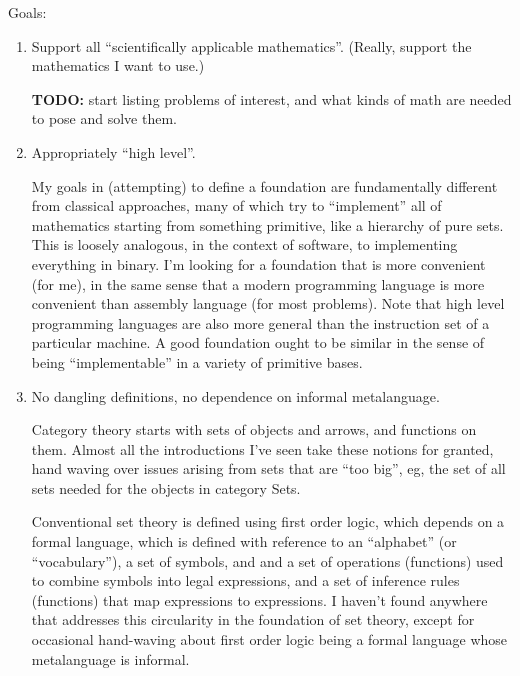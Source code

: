 \documentclass[11pt]{book}
\begin{document}
Goals:
\begin{enumerate}
  \item Support all ``scientifically applicable mathematics''.
  (Really, support the mathematics I want to use.) \par
  \textbf{TODO:} start listing problems of interest,
  and what kinds of math are needed to pose and solve them.
  
  \item Appropriately ``high level''. \par
  My goals in (attempting) to define a foundation are fundamentally
different from classical approaches,
many of which try to ``implement'' all of mathematics starting from
something primitive, like a hierarchy of pure sets.
This is loosely analogous, in the context of software,
to implementing everything in binary.
I'm looking for a foundation that is more convenient (for me),
in the same sense that a modern programming language is more
convenient than assembly language (for most problems).
Note that high level programming languages are also more general
than the instruction set of a particular machine.
A good foundation ought to be similar in the sense of being
``implementable'' in a variety of primitive bases.

  \item No dangling definitions, no dependence on informal metalanguage.
   \par
  Category theory starts with sets of objects and arrows, 
  and functions on them. Almost all the introductions I've seen 
  take these notions for granted, hand waving over issues arising
  from sets that are ``too big'', eg, the set of all sets needed
  for the objects in category Sets.
  \par
  Conventional set theory is defined using first order logic,
  which depends on a formal language, which is defined with
  reference to an ``alphabet'' (or ``vocabulary''), 
  a set of symbols, and and a set of
  operations (functions) used to combine symbols into legal 
  expressions, and a set of inference rules (functions) that map
  expressions to expressions. I haven't found anywhere that
  addresses this circularity in the foundation of set theory,
  except for occasional hand-waving about first order logic
  being a formal language whose metalanguage is informal.
  

\end{enumerate}
\end{document}
